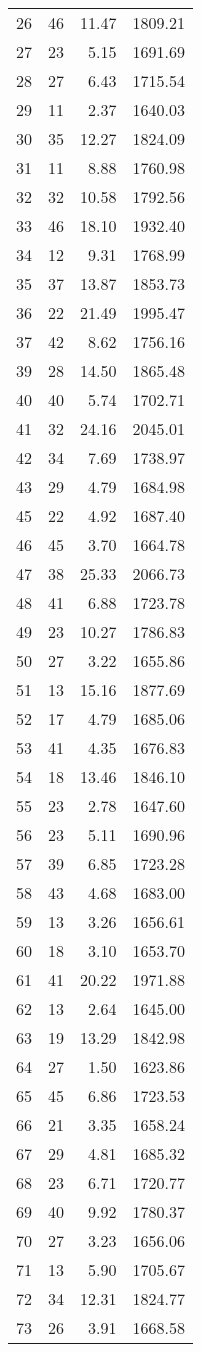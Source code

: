 \begin{appendix}
\begin{longtable}{rrrr}
26 & 46 & 11.47 & 1809.21 \\
27 & 23 & 5.15 & 1691.69 \\
28 & 27 & 6.43 & 1715.54 \\
29 & 11 & 2.37 & 1640.03 \\
30 & 35 & 12.27 & 1824.09 \\
31 & 11 & 8.88 & 1760.98 \\
32 & 32 & 10.58 & 1792.56 \\
33 & 46 & 18.10 & 1932.40 \\
34 & 12 & 9.31 & 1768.99 \\
35 & 37 & 13.87 & 1853.73 \\
36 & 22 & 21.49 & 1995.47 \\
37 & 42 & 8.62 & 1756.16 \\
39 & 28 & 14.50 & 1865.48 \\
40 & 40 & 5.74 & 1702.71 \\
41 & 32 & 24.16 & 2045.01 \\
42 & 34 & 7.69 & 1738.97 \\
43 & 29 & 4.79 & 1684.98 \\
45 & 22 & 4.92 & 1687.40 \\
46 & 45 & 3.70 & 1664.78 \\
47 & 38 & 25.33 & 2066.73 \\
48 & 41 & 6.88 & 1723.78 \\
49 & 23 & 10.27 & 1786.83 \\
50 & 27 & 3.22 & 1655.86 \\
51 & 13 & 15.16 & 1877.69 \\
52 & 17 & 4.79 & 1685.06 \\
53 & 41 & 4.35 & 1676.83 \\
54 & 18 & 13.46 & 1846.10 \\
55 & 23 & 2.78 & 1647.60 \\
56 & 23 & 5.11 & 1690.96 \\
57 & 39 & 6.85 & 1723.28 \\
58 & 43 & 4.68 & 1683.00 \\
59 & 13 & 3.26 & 1656.61 \\
60 & 18 & 3.10 & 1653.70 \\
61 & 41 & 20.22 & 1971.88 \\
62 & 13 & 2.64 & 1645.00 \\
63 & 19 & 13.29 & 1842.98 \\
64 & 27 & 1.50 & 1623.86 \\
65 & 45 & 6.86 & 1723.53 \\
66 & 21 & 3.35 & 1658.24 \\
67 & 29 & 4.81 & 1685.32 \\
68 & 23 & 6.71 & 1720.77 \\
69 & 40 & 9.92 & 1780.37 \\
70 & 27 & 3.23 & 1656.06 \\
71 & 13 & 5.90 & 1705.67 \\
72 & 34 & 12.31 & 1824.77 \\
73 & 26 & 3.91 & 1668.58 \\
\bottomrule
\end{longtable}


\end{appendix}
